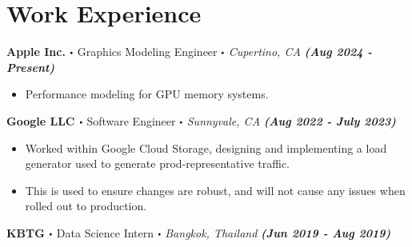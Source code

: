 \documentclass[10pt]{article}
\newcommand\sbullet[1][.5]{\mathbin{\vcenter{\hbox{\scalebox{#1}{$\bullet$}}}}}
\begin{document}
  \vspace*{-1.0cm}
  \section*{\Large \textcolor{lighterB} {Work Experience}}

\textbf{\large Apple Inc. $\sbullet$} {\large Graphics Modeling Engineer $\sbullet$ \textit{Cupertino, CA}} {\hfill \textit{\textbf{(Aug 2024 - Present)}}}

  \vspace*{-0.2cm}
  \begin{itemize}
    \itemsep-0.4em
    \item \textcolor{lighterG}{Performance modeling for GPU memory systems.}
  \end{itemize}


\textbf{\large Google LLC $\sbullet$} {\large Software Engineer $\sbullet$ \textit{Sunnyvale, CA}} {\hfill \textit{\textbf{(Aug 2022 - July 2023)}}}

  \vspace*{-0.2cm}
  \begin{itemize}
    \itemsep-0.4em
\item \textcolor{lighterG}{Worked within Google Cloud Storage, designing and implementing a load generator used to generate prod-representative traffic.}
    \item \textcolor{lighterG}{This is used to ensure changes are robust, and will not cause any issues when rolled out to production.}
  \end{itemize}

\textbf{\large KBTG $\sbullet$} {\large Data Science Intern $\sbullet$ \textit{Bangkok, Thailand}} {\hfill \textit{\textbf{(Jun 2019 - Aug 2019)}}}
\end{document}
